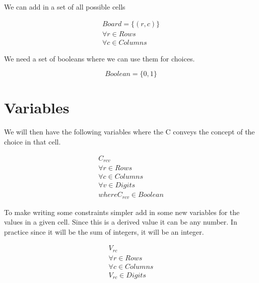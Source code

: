 \documentclass{article}
\begin{document}
We can add in a set of all possible cells

\begin{equation}
\begin{split}
Board = \lbrace (r,c) \rbrace  \\
\forall r\in Rows \\
\forall c \in Columns
\end{split}
\end{equation}

We need a set of booleans where we can use them for choices. 

\begin{equation}
Boolean=\lbrace 0,1 \rbrace
\end{equation}


\section{Variables}

We will then have the following variables where the C conveys the concept of the choice in that cell. 

\begin{equation}
\begin{split}
C_{rcv} \\
\forall r \in Rows \\
\forall c \in Columns \\
\forall v \in Digits \\
where C_{rcv} \in Boolean
\end{split}
\end{equation}

To make writing some constraints simpler add in some new variables for the values in a given cell. Since this is a derived value it can be any number. 
In practice since it will be the sum of integers, it will be an integer.

\begin{equation}
\begin{split}
V_{rc} \\
\forall r \in Rows \\
\forall c \in Columns \\
V_{rc} \in Digits
\end{split}
\end{equation}

\end{document}
